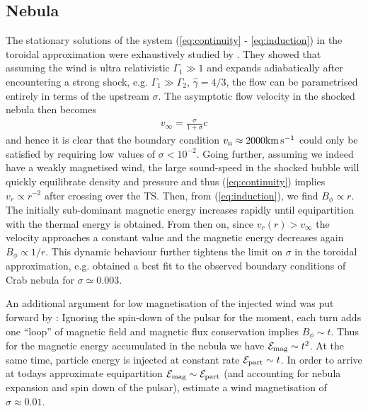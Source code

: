 \subsection{Nebula}

The stationary solutions of the system (\ref{eq:continuity} - \ref{eq:induction}) in the toroidal approximation were exhaustively studied by \cite{1984ApJ...283..694K}.  They showed that assuming the wind is ultra relativistic $\Gamma_1\gg1$ and expands adiabatically after encountering a strong shock, e.g. $\Gamma_1\gg\Gamma_2$, $\hat{\gamma}=4/3$, the flow can be parametrised entirely in terms of the upstream $\sigma$.  
The asymptotic flow velocity in the shocked nebula then becomes
\begin{align}
v_{\infty} = \frac{\sigma}{1+\sigma} c
\end{align}
and hence it is clear that the boundary condition $v_{\rm n}\approx 2000 \rm km\, s^{-1}$ could only be satisfied by requiring low values of $\sigma<10^{-2}$.  
Going further, assuming we indeed have a weakly magnetised wind, the large sound-speed in the shocked bubble will quickly equilibrate density and pressure and thus (\ref{eq:continuity}) implies $v_r\propto r^{-2}$ after crossing over the TS.  Then, from (\ref{eq:induction}), we find $B_\phi\propto r$.  The initially sub-dominant magnetic energy increases rapidly until equipartition with the thermal energy is obtained.  From then on, since $v_r(r)>v_{\infty}$ the velocity approaches a constant value and the magnetic energy decreases again $B_\phi\propto 1/r$.  
This dynamic behaviour further tightens the limit on $\sigma$ in the toroidal approximation, e.g. \cite{1984ApJ...283..694K} obtained a best fit to the observed boundary conditions of Crab nebula for $\sigma\simeq 0.003$.  

An additional argument for low magnetisation of the injected wind was put forward by \cite{1974MNRAS.167....1R}:  Ignoring the spin-down of the pulsar for the moment, each turn adds one ``loop'' of magnetic field and magnetic flux conservation implies $B_\phi\sim t$.  Thus for the magnetic energy accumulated in the nebula we have $\mathcal{E}_{\rm mag}\sim t^2$.  At the same time, particle energy is injected at constant rate $\mathcal{E}_{\rm part}\sim t$. In order to arrive at todays approximate equipartition $\mathcal{E}_{\rm mag}\sim\mathcal{E}_{\rm part}$ (and accounting for nebula expansion and spin down of the pulsar), \cite{1974MNRAS.167....1R} estimate a wind magnetisation of $\sigma\approx0.01$.

